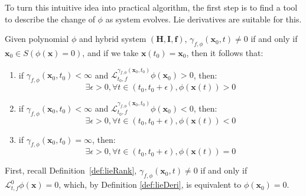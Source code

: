 \documentclass{jssc}
\begin{document}
To turn this intuitive idea into practical algorithm, the first step is to find a tool to describe the change of $\phi$ as system evolves. Lie derivatives are suitable for this.

\begin{theorem}
\label{thm:lieDeri}
Given polynomial $\phi$ and hybrid system $(\boldsymbol{H}, \boldsymbol{I}, \boldsymbol{f})$, $\gamma_{f, \phi}(\boldsymbol{x}_0, t) \neq 0$ if and only if $\boldsymbol{x}_0 \in S(\phi(\boldsymbol{x}) = 0)$,  and if we take $\boldsymbol{x}(t_0) = \boldsymbol{x}_0$, then it follows that:
\begin{enumerate}
	\item if $\gamma_{f, \phi}(\boldsymbol{x}_0, t_0) < \infty$ and $\mathcal{L}_{t_0, f}^{\gamma_{f, \phi}(\boldsymbol{x}_0, t_0)} \phi (\boldsymbol{x}_0) > 0$, then:
		\begin{equation*}
			\exists \epsilon > 0, \forall t \in (t_0, t_0 + \epsilon),\phi (\boldsymbol{x}(t)) > 0
		\end{equation*}
	\item if $\gamma_{f, \phi}(\boldsymbol{x}_0, t_0) < \infty$ and $\mathcal{L}_{t_0, f}^{\gamma_{f, \phi}(\boldsymbol{x}_0, t_0)} \phi (\boldsymbol{x}_0) < 0$, then:
		\begin{equation*}
			\exists \epsilon > 0, \forall t \in (t_0, t_0 + \epsilon),\phi (\boldsymbol{x}(t)) < 0
		\end{equation*}
	\item if $\gamma_{f, \phi}(\boldsymbol{x}_0, t_0) = \infty$, then:
		\begin{equation*}
			\exists \epsilon > 0, \forall t \in (t_0, t_0 + \epsilon),\phi (\boldsymbol{x}(t)) = 0
		\end{equation*}
\end{enumerate}
\end{theorem}

\proof
First, recall Definition~\ref{def:lieRank}, $\gamma_{f, \phi}(\boldsymbol{x}_0, t) \neq 0$ if and only if $\mathcal{L}_{t, f}^0 \phi (\boldsymbol{x}) = 0$, which, by Definition \ref{def:lieDeri}, is equivalent to $\phi(\boldsymbol{x}_0) = 0$.
\end{document}
